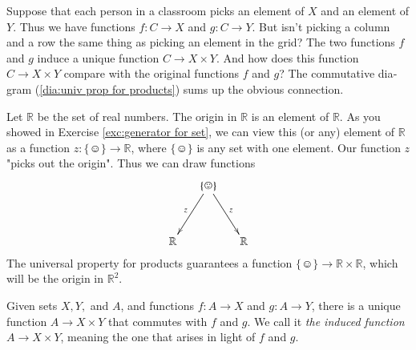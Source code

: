 \documentclass{book}
\def\RR{{\mathbb R}}
\def\singleton{\{\smiley\}}
\def\to{\rightarrow}
\def\taking{\colon}
\theoremstyle{theoremENG}
\theoremstyle{lemmaENG}
\theoremstyle{propositionENG}
\theoremstyle{corollaryENG}
\theoremstyle{factENG}
\theoremstyle{remarkENG}
\newtheorem{remarkENG}[subsubsection]{\begin{english}Remark\end{english}}
\theoremstyle{exampleENG}
\newtheorem{exampleENG}[subsubsection]{\begin{english}Example\end{english}}
\theoremstyle{warningENG}
\theoremstyle{questionENG}
\theoremstyle{guessENG}
\theoremstyle{answerENG}
\theoremstyle{constructionENG}
\theoremstyle{rulesENG}
\theoremstyle{excENG}
\theoremstyle{appENG}
\theoremstyle{definitionENG}
\theoremstyle{notationENG}
\theoremstyle{conjectureENG}
\theoremstyle{postulateENG}
\theoremstyle{theoremRUS}
\theoremstyle{lemmaRUS}
\theoremstyle{propositionRUS}
\theoremstyle{corollaryRUS}
\theoremstyle{factRUS}
\theoremstyle{remarkRUS}
\theoremstyle{exampleRUS}
\theoremstyle{warningRUS}
\theoremstyle{questionRUS}
\theoremstyle{guessRUS}
\theoremstyle{answerRUS}
\theoremstyle{constructionRUS}
\theoremstyle{rulesRUS}
\theoremstyle{excRUS}
\theoremstyle{appRUS}
\theoremstyle{definitionRUS}
\theoremstyle{notationRUS}
\theoremstyle{conjectureRUS}
\theoremstyle{postulateRUS}
\begin{document}
\begin{english}
\begin{exampleENG}
\begin{russian} \end{russian}

Suppose that each person in a classroom picks an element of $X$ and an element of $Y$. Thus we have functions $f\taking C\to X$ and $g\taking C\to Y$. But isn't picking a column and a row the same thing as picking an element in the grid? The two functions $f$ and $g$ induce a unique function $C\to X\times Y$. And how does this function $C\to X\times Y$ compare with the original functions $f$ and $g$? The commutative diagram (\ref{dia:univ prop for products}) sums up the obvious connection. 

\begin{russian} \end{russian}

\end{exampleENG}

\begin{exampleENG}

Let $\RR$ be the set of real numbers. The origin in $\RR$ is an element of $\RR$. As you showed in Exercise \ref{exc:generator for set}, we can view this (or any) element of $\RR$ as a function $z\taking\singleton\to\RR$, where $\singleton$ is any set with one element. Our function $z$ "picks out the origin". Thus we can draw functions 
$$\xymatrix@=15pt{&\singleton\ar[ddr]^z\ar[ddl]_z\\\\\RR&&\RR}
$$
The universal property for products guarantees a function $\singleton\to\RR\times\RR$, which will be the origin in $\RR^2.$

\begin{russian} \end{russian}

\end{exampleENG}

\begin{remarkENG}

Given sets $X, Y,$ and $A$, and functions $f\taking A\to X$ and $g\taking A\to Y$, there is a unique function $A\to X\times Y$ that commutes with $f$ and $g$. We call it {\em the induced function $A\to X\times Y$}, meaning the one that arises in light of $f$ and $g$.

\begin{russian} \end{russian}

\end{remarkENG}


\end{english}
\end{document}
